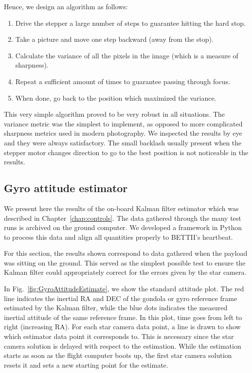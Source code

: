 Hence, we design an algorithm as follows:
\begin{enumerate}
\item Drive the stepper a large number of steps to guarantee hitting the hard stop.
\item Take a picture and move one step backward (away from the stop).
\item Calculate the variance of all the pixels in the image (which is a measure of sharpness).
\item Repeat a sufficient amount of times to guarantee passing through focus.
\item When done, go back to the position which maximized the variance.
\end{enumerate}

This very simple algorithm proved to be very robust in all situations. The variance metric was the simplest to implement, as opposed to more complicated sharpness metrics used in modern photography. We inspected the results by eye and they were always satisfactory. The small backlash usually present when the stepper motor changes direction to go to the best position is not noticeable in the results.


\subsection{Gyro attitude estimator}

We present here the results of the on-board Kalman filter estimator which was described in Chapter~\ref{chap:controls}. The data gathered through the many test runs is archived on the ground computer. We developed a framework in Python to process this data and align all quantities properly to BETTII's heartbeat. 

For this section, the results shown correspond to data gathered when the payload was sitting on the ground. This served as the simplest possible test to ensure the Kalman filter could appropriately correct for the errors given by the star camera. 

In Fig.~\ref{fig:GyroAttitudeEstimate}, we show the standard attitude plot. The red line indicates the inertial RA and DEC of the gondola or gyro reference frame estimated by the Kalman filter, while the blue dots indicates the measured inertial attitude of the same reference frame. In this plot, time goes from left to right (increasing RA). For each star camera data point, a line is drawn to show which estimator data point it corresponds to. This is necessary since the star camera solution is delayed with respect to the estimation. While the estimation starts as soon as the flight computer boots up, the first star camera solution resets it and sets a new starting point for the estimate.

